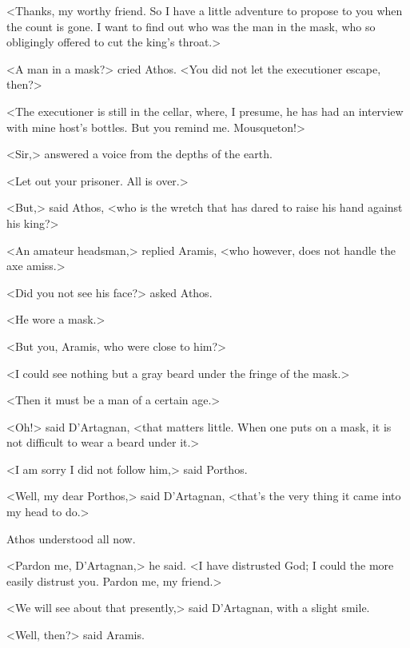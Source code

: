 <Thanks, my worthy friend. So I have a little adventure to propose to you when the count is gone. I want to find out who was the man in the mask, who so obligingly offered to cut the king's throat.>

<A man in a mask?> cried Athos. <You did not let the executioner escape, then?>

<The executioner is still in the cellar, where, I presume, he has had an interview with mine host's bottles. But you remind me. Mousqueton!>

<Sir,> answered a voice from the depths of the earth.

<Let out your prisoner. All is over.>

<But,> said Athos, <who is the wretch that has dared to raise his hand against his king?>

<An amateur headsman,> replied Aramis, <who however, does not handle the axe amiss.>

<Did you not see his face?> asked Athos.

<He wore a mask.>

<But you, Aramis, who were close to him?>

<I could see nothing but a gray beard under the fringe of the mask.>

<Then it must be a man of a certain age.>

<Oh!> said D'Artagnan, <that matters little. When one puts on a mask, it is not difficult to wear a beard under it.>

<I am sorry I did not follow him,> said Porthos.

<Well, my dear Porthos,> said D'Artagnan, <that's the very thing it came into my head to do.>

Athos understood all now.

<Pardon me, D'Artagnan,> he said. <I have distrusted God; I could the more easily distrust you. Pardon me, my friend.>

<We will see about that presently,> said D'Artagnan, with a slight smile.

<Well, then?> said Aramis.

